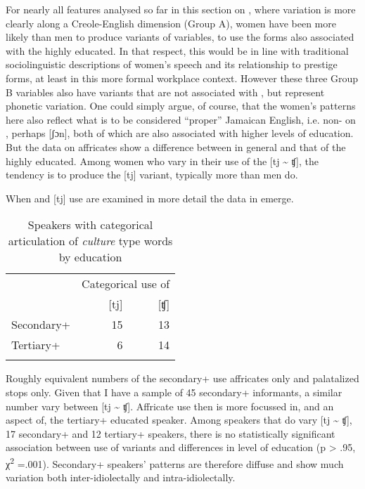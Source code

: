 For nearly all features analysed so far in this section on , where variation is more clearly along a Creole-English dimension (Group A), women have been more likely than men to produce  variants of variables, to use the forms also associated with the highly educated.  In that respect, this would be in line with traditional sociolinguistic descriptions of women’s speech and its relationship to prestige forms, at least in this more formal workplace context.  However these three Group B variables also have variants that are not associated with , but represent  phonetic variation.  One could simply argue, of course, that the women’s patterns here also reflect what is to be considered “proper” Jamaican English, i.e. non- on , perhaps [ʃɔn], both of which are also associated with higher levels of education.  But the data on affricates show a difference between  in general and that of the highly educated.  Among women who vary in their use of the [tj {\textasciitilde} ʧ], the tendency is to produce the [tj] variant, typically more than men do.  

When  and [tj] use are examined in more detail the data in  emerge.

\begin{table}
\begin{tabular}{lrr}
\lsptoprule
		 & \multicolumn{2}{c}{Categorical use of}\\\cmidrule(lr){2-3}
         &       [tj] & [ʧ]\\\midrule
Secondary+  &  15  & 13 \\
Tertiary+   &   6  &  14\\\lspbottomrule
\end{tabular}
\caption{Speakers with categorical articulation of \textit{culture} type words by education}
\label{tab:3.32}
\end{table}

Roughly equivalent numbers of the secondary+ use affricates only and palatalized stops only.  Given that I have a sample of 45 secondary+ informants, a similar number vary between [tj {\textasciitilde} ʧ].  Affricate use then is more focussed in, and an aspect of, the tertiary+ educated speaker.  Among speakers that do vary [tj {\textasciitilde} ʧ], 17 secondary+ and 12 tertiary+ speakers, there is no statistically significant association between use of variants and differences in level of education (p > .95, χ\textsuperscript{2} =.001).  Secondary+ speakers’ patterns are therefore diffuse and show much variation both inter-idiolectally and intra-idiolectally.  

